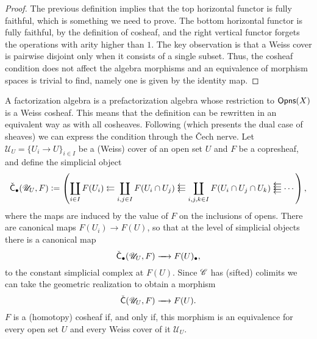 \documentclass[../text]{subfiles}
\begin{document}
\begin{proof}
    The previous definition implies that the top horizontal functor is fully faithful, which is something we need to prove. The bottom horizontal functor is fully faithful, by the definition of cosheaf, and the right vertical functor forgets the operations with arity higher than $1$. The key observation is that a Weiss cover is pairwise disjoint only when it consists of a single subset. Thus, the cosheaf condition does not affect the algebra morphisms and an equivalence of morphism spaces is trivial to find, namely one is given by the identity map.
\end{proof}

\begin{remark}\label{rem:check_nerve}
    A factorization algebra is a prefactorization algebra whose restriction to $\opens[r](X)$ is a Weiss cosheaf. This means that the definition can be rewritten in an equivalent way as with all cosheaves. Following \cite{nlab} (which presents the dual case of sheaves) we can express the condition through the \v{C}ech nerve. Let $\mathscr{U}_U = \{ U_i \rightarrow U\}_{i \in I}$ be a (Weiss) cover of an open set $U$ and $F$ be a copresheaf, and define the simplicial object
    \begin{equation}
        \check{\mathsf{C}}_{\bullet}(\mathscr{U}_U, F) := \left( \coprod_{i \in I} F(U_i) \leftleftarrows \coprod_{i, j \in I} F(U_i \cap U_j) \mathrel{\substack{\textstyle\leftarrow\\[-0.6ex]
        \textstyle\leftarrow\\[-0.6ex]\textstyle\leftarrow}} \coprod_{i, j, k \in I} F(U_i \cap U_j \cap U_k) \mathrel{\substack{\textstyle\leftarrow\\[-0.6ex]\textstyle\leftarrow\\[-0.6ex]\textstyle\leftarrow\\[-0.6ex]\textstyle\leftarrow}} \cdots  \right),
    \end{equation}
    where the maps are induced by the value of $F$ on the inclusions of opens. There are canonical maps $F(U_i) \rightarrow F(U)$, so that at the level of simplicial objects there is a canonical map
    \begin{equation}
        \check{\mathsf{C}}_{\bullet} (\mathscr{U}_U, F) \xrightarrow{\quad} F(U)_{\bullet},
    \end{equation}
    to the constant simplicial complex at $F(U)$. Since $\mathscr{C}$ has (sifted) colimits we can take the geometric realization to obtain a morphism
    \begin{equation}
        \check{\mathsf{C}}(\mathscr{U}_U, F) \xrightarrow{\quad} F(U).
    \end{equation}
    $F$ is a (homotopy) cosheaf if, and only if, this morphism is an equivalence for every open set $U$ and every Weiss cover of it $\mathscr{U}_U$.
\end{remark}
\end{document}
